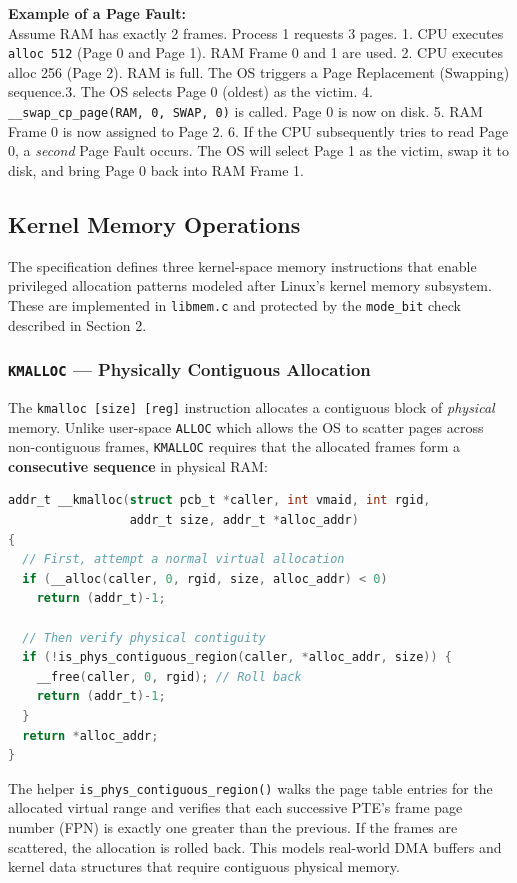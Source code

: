 \textbf{Example of a Page Fault:}\\
Assume RAM has exactly 2 frames. Process 1 requests 3 pages.
1. CPU executes \texttt{alloc 512} (Page 0 and Page 1). RAM Frame 0 and 1 are used.
2. CPU executes alloc 256 (Page 2). RAM is full. The OS triggers a Page Replacement (Swapping) sequence.3. The OS selects Page 0 (oldest) as the victim. 
4. \texttt{\_\_swap\_cp\_page(RAM, 0, SWAP, 0)} is called. Page 0 is now on disk.
5. RAM Frame 0 is now assigned to Page 2. 
6. If the CPU subsequently tries to read Page 0, a \textit{second} Page Fault occurs. The OS will select Page 1 as the victim, swap it to disk, and bring Page 0 back into RAM Frame 1.

\subsection{Kernel Memory Operations}
The specification defines three kernel-space memory instructions that enable privileged allocation patterns modeled after Linux's kernel memory subsystem. These are implemented in \texttt{libmem.c} and protected by the \texttt{mode\_bit} check described in Section 2.

\subsubsection{\texttt{KMALLOC} --- Physically Contiguous Allocation}
The \texttt{kmalloc [size] [reg]} instruction allocates a contiguous block of \textit{physical} memory. Unlike user-space \texttt{ALLOC} which allows the OS to scatter pages across non-contiguous frames, \texttt{KMALLOC} requires that the allocated frames form a \textbf{consecutive sequence} in physical RAM:
\begin{lstlisting}[language=C, caption=\texttt{\_\_kmalloc} contiguity check (\texttt{libmem.c})]
addr_t __kmalloc(struct pcb_t *caller, int vmaid, int rgid, 
                 addr_t size, addr_t *alloc_addr)
{
  // First, attempt a normal virtual allocation
  if (__alloc(caller, 0, rgid, size, alloc_addr) < 0)
    return (addr_t)-1;

  // Then verify physical contiguity
  if (!is_phys_contiguous_region(caller, *alloc_addr, size)) {
    __free(caller, 0, rgid); // Roll back
    return (addr_t)-1;
  }
  return *alloc_addr;
}
\end{lstlisting}
The helper \texttt{is\_phys\_contiguous\_region()} walks the page table entries for the allocated virtual range and verifies that each successive PTE's frame page number (FPN) is exactly one greater than the previous. If the frames are scattered, the allocation is rolled back. This models real-world DMA buffers and kernel data structures that require contiguous physical memory.

